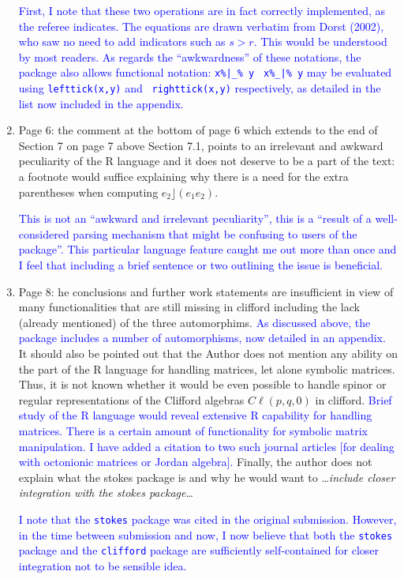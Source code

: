 \documentclass{article}
\newcommand{\cliff}[1]{\ensuremath{C\ell\left(#1\right)}}
\begin{document}
\begin{enumerate}
\textcolor{blue}{First, I note that these two operations are in fact
  correctly implemented, as the referee indicates.  The equations are
  drawn verbatim from Dorst (2002), who saw no need to add
  indicators such as $s>r$. This would be understood by
  most readers.  As regards the ``awkwardness'' of these notations,
  the package also allows functional notation: {\tt x\%|\_\% y} {\tt
    x\%\_|\% y} may be evaluated using {\tt lefttick(x,y)} and {\tt
    righttick(x,y)} respectively, as detailed in the list now included
  in the appendix.}

\item Page 6: the comment at the bottom of page 6 which extends to the
  end of Section 7 on page 7 above Section 7.1, points to an
  irrelevant and awkward peculiarity of the R language and it does not
  deserve to be a part of the text: a footnote would suffice
  explaining why there is a need for the extra parentheses when
  computing $e_2\rfloor (e_1e_2)$.

  \textcolor{blue}{This is not an ``awkward and irrelevant
    peculiarity'', this is a ``result of a well-considered parsing
    mechanism that might be confusing to users of the package''.  This
    particular language feature caught me out more than once and I
    feel that including a brief sentence or two outlining the issue is
    beneficial.}


\item Page 8: he conclusions and further work statements are
  insufficient in view of many functionalities that are still missing
  in clifford including the lack (already mentioned) of the three
  automorphims. \textcolor{blue}{As discussed above, the package
    includes a number of automorphisms, now detailed in an appendix.}
  It should also be pointed out that the Author does not mention any
  ability on the part of the R language for handling matrices, let
  alone symbolic matrices.  Thus, it is not known whether it would be
  even possible to handle spinor or regular representations of the
  Clifford algebras \cliff{p, q, 0} in clifford.
  \textcolor{blue}{Brief study of the R language would reveal
    extensive R capability for handling matrices.  There is a certain
    amount of functionality for symbolic matrix manipulation.  I have
    added a citation to two such journal articles [for dealing with
      octonionic matrices or Jordan algebra].}  Finally, the author
  does not explain what the stokes package is and why he would want to
  \ldots{\em include closer integration with the stokes package}\ldots

  \textcolor{blue}{I note that the {\tt stokes} package was cited in
    the original submission.  However, in the time between submission
    and now, I now believe that both the {\tt stokes} package and the
    {\tt clifford} package are sufficiently self-contained for closer
    integration not to be sensible idea.}


\end{enumerate}
\end{document}
